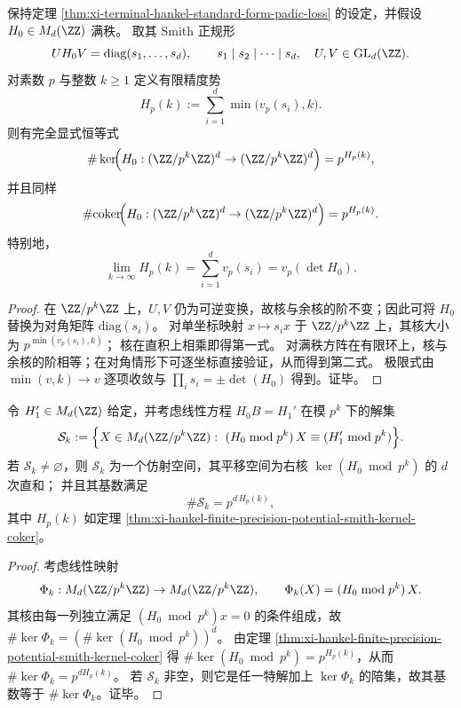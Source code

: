 \begin{theorem}\label{thm:xi-hankel-finite-precision-potential-smith-kernel-coker}
保持定理 \ref{thm:xi-terminal-hankel-standard-form-padic-loss} 的设定，并假设 \(H_0\in M_d(\ZZ)\) 满秩。
取其 Smith 正规形
\[
UH_0V=\mathrm{diag}(s_1,\dots,s_d),\qquad
s_1\mid s_2\mid\cdots\mid s_d,\quad U,V\in \mathrm{GL}_d(\ZZ).
\]
对素数 \(p\) 与整数 \(k\ge 1\) 定义有限精度势
\[
H_p(k):=\sum_{i=1}^{d}\min\bigl(v_p(s_i),k\bigr).
\]
则有完全显式恒等式
\[
\#\ker\!\Bigl(H_0:(\ZZ/p^k\ZZ)^d\to(\ZZ/p^k\ZZ)^d\Bigr)=p^{H_p(k)},
\]
并且同样
\[
\#\mathrm{coker}\!\Bigl(H_0:(\ZZ/p^k\ZZ)^d\to(\ZZ/p^k\ZZ)^d\Bigr)=p^{H_p(k)}.
\]
特别地，
\[
\lim_{k\to\infty}H_p(k)=\sum_{i=1}^{d}v_p(s_i)=v_p(\det H_0).
\]
\end{theorem}
\begin{proof}
在 \(\ZZ/p^k\ZZ\) 上，\(U,V\) 仍为可逆变换，故核与余核的阶不变；因此可将 \(H_0\) 替换为对角矩阵 \(\mathrm{diag}(s_i)\)。
对单坐标映射 \(x\mapsto s_ix\) 于 \(\ZZ/p^k\ZZ\) 上，其核大小为 \(p^{\min(v_p(s_i),k)}\)；
核在直积上相乘即得第一式。
对满秩方阵在有限环上，核与余核的阶相等；在对角情形下可逐坐标直接验证，从而得到第二式。
极限式由 \(\min(v,k)\to v\) 逐项收敛与 \(\prod_i s_i=\pm\det(H_0)\) 得到。证毕。
\end{proof}

\begin{corollary}\label{cor:xi-hankel-lifting-branch-count-affine-solution-space}
令 \(H_1'\in M_d(\ZZ)\) 给定，并考虑线性方程 \(H_0B=H_1'\) 在模 \(p^k\) 下的解集
\[
\mathcal S_k:=\Bigl\{X\in M_d(\ZZ/p^k\ZZ):\ (H_0\bmod p^k)\,X\equiv (H_1'\bmod p^k)\Bigr\}.
\]
若 \(\mathcal S_k\neq\varnothing\)，则 \(\mathcal S_k\) 为一个仿射空间，其平移空间为右核 \(\ker(H_0\bmod p^k)\) 的 \(d\) 次直和；
并且其基数满足
\[
\#\mathcal S_k=p^{d\,H_p(k)},
\]
其中 \(H_p(k)\) 如定理 \ref{thm:xi-hankel-finite-precision-potential-smith-kernel-coker}。
\end{corollary}
\begin{proof}
考虑线性映射
\[
\Phi_k:M_d(\ZZ/p^k\ZZ)\to M_d(\ZZ/p^k\ZZ),\qquad
\Phi_k(X)=(H_0\bmod p^k)\,X.
\]
其核由每一列独立满足 \((H_0\bmod p^k)x=0\) 的条件组成，故
\(
\#\ker\Phi_k=(\#\ker(H_0\bmod p^k))^d
\)。
由定理 \ref{thm:xi-hankel-finite-precision-potential-smith-kernel-coker} 得 \(\#\ker(H_0\bmod p^k)=p^{H_p(k)}\)，从而 \(\#\ker\Phi_k=p^{dH_p(k)}\)。
若 \(\mathcal S_k\) 非空，则它是任一特解加上 \(\ker\Phi_k\) 的陪集，故其基数等于 \(\#\ker\Phi_k\)。证毕。
\end{proof}

